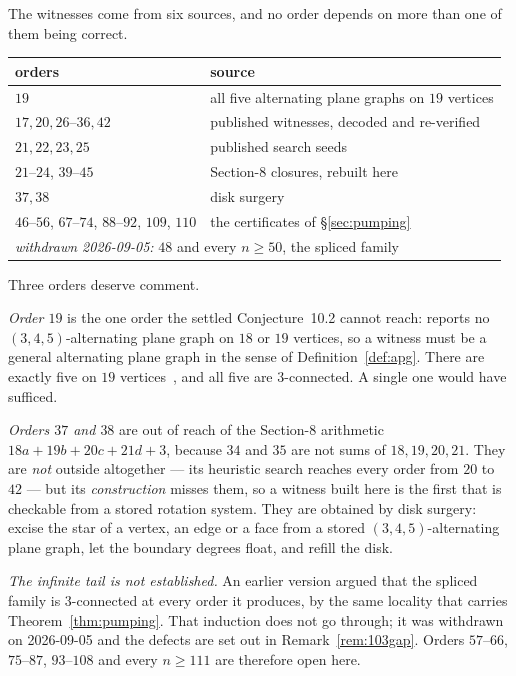 \documentclass[11pt,a4paper]{amsart}
\theoremstyle{plain}
\theoremstyle{definition}
\begin{document}
The witnesses come from six sources, and no order depends on more than one of
them being correct.

\begin{center}
\begin{tabular}{ll}
\toprule
orders & source \\
\midrule
$19$ & all five alternating plane graphs on $19$ vertices \\
$17, 20, 26$--$36, 42$ & published witnesses, decoded and re-verified \\
$21, 22, 23, 25$ & published search seeds \\
$21$--$24$, $39$--$45$ & Section-8 closures, rebuilt here \\
$37, 38$ & disk surgery \\
$46$--$56$, $67$--$74$, $88$--$92$, $109$, $110$ & the certificates of \S\ref{sec:pumping} \\
\midrule
\multicolumn{2}{l}{\emph{withdrawn 2026-09-05:} $48$ and every $n \ge 50$, the spliced family} \\
\bottomrule
\end{tabular}
\end{center}

Three orders deserve comment.

\emph{Order $19$} is the one order the settled Conjecture~10.2 cannot reach:
\cite{AHSSV2015} reports no $(3,4,5)$-alternating plane graph on $18$ or $19$
vertices, so a witness must be a general alternating plane graph in the sense of
Definition~\ref{def:apg}. There are exactly five on $19$ vertices~\cite{HoG}, and all
five are $3$-connected. A single one would have sufficed.

\emph{Orders $37$ and $38$} are out of reach of the Section-8 arithmetic
$18a+19b+20c+21d+3$, because $34$ and $35$ are not sums of $18,19,20,21$. They
are \emph{not} outside \cite{AHSSV2015} altogether --- its heuristic search
reaches every order from $20$ to $42$ --- but its \emph{construction} misses
them, so a witness built here is the first that is checkable from a stored
rotation system. They are obtained by
disk surgery: excise the star of a vertex, an edge or a face from a stored
$(3,4,5)$-alternating plane graph, let the boundary degrees float, and refill
the disk.

\emph{The infinite tail is not established.} An earlier version argued that the
spliced family is $3$-connected at every order it produces, by the same locality
that carries Theorem~\ref{thm:pumping}. That induction does not go through; it
was withdrawn on 2026-09-05 and the defects are set out in
Remark~\ref{rem:103gap}. Orders $57$--$66$, $75$--$87$, $93$--$108$ and every
$n \ge 111$ are therefore open here.
\end{document}
